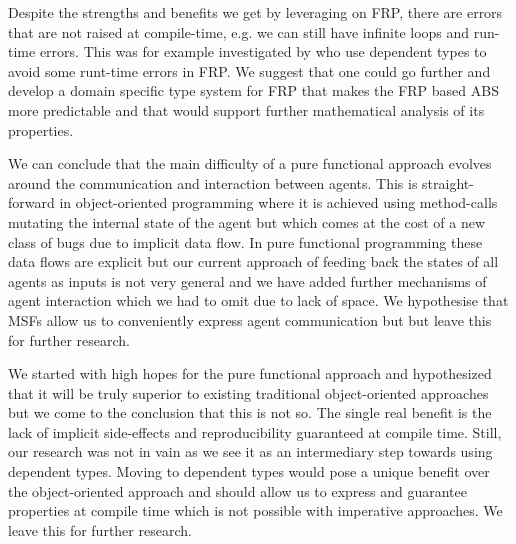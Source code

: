 Despite the strengths and benefits we get by leveraging on FRP, there are errors that are not raised at compile-time, e.g. we can still have infinite loops and run-time errors. This was for example investigated by \cite{sculthorpe_safe_2009} who use dependent types to avoid some runt-time errors in FRP. We suggest that one could go further and develop a domain specific type system for FRP that makes the FRP based ABS more predictable and that would support further mathematical analysis of its properties.

We can conclude that the main difficulty of a pure functional approach evolves around the communication and interaction between agents. This is straight-forward in object-oriented programming where it is achieved using method-calls mutating the internal state of the agent but which comes at the cost of a new class of bugs due to implicit data flow. In pure functional programming these data flows are explicit but our current approach of feeding back the states of all agents as inputs is not very general and we have added further mechanisms of agent interaction which we had to omit due to lack of space. We hypothesise that MSFs allow us to conveniently express agent communication but but leave this for further research.

We started with high hopes for the pure functional approach and hypothesized that it will be truly superior to existing traditional object-oriented approaches but we come to the conclusion that this is not so. The single real benefit is the lack of implicit side-effects and reproducibility guaranteed at compile time. Still, our research was not in vain as we see it as an intermediary step towards using dependent types. Moving to dependent types would pose a unique benefit over the object-oriented approach and should allow us to express and guarantee properties at compile time which is not possible with imperative approaches. We leave this for further research.